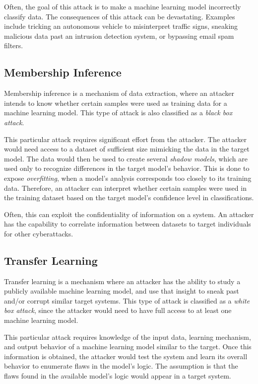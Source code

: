 \documentclass[11pt,conference]{IEEEtran}
\begin{document}
Often, the goal of this
attack is to make a machine learning model incorrectly classify data. The
consequences of this attack can be devastating. Examples include tricking an
autonomous vehicle to misinterpret traffic signs, sneaking malicious data past an
intrusion detection system, or bypassing email spam filters.

\subsection{Membership Inference}
Membership inference is a mechanism of data extraction, where an attacker 
intends to know whether certain samples were used as training data for a
machine learning model. This type of attack is also classified as a \emph{black box attack}.

This particular attack requires significant effort from the attacker.
The attacker would need access to a dataset of sufficient size mimicking the
data in the target model. The data would then be used to create several
\emph{shadow models}, which are used only to recognize differences
in the target model's behavior. This is done to expose \emph{overfitting}, when a model's analysis corresponds too
closely to its training data. Therefore, an attacker can interpret whether
certain samples were used in the training dataset based on the target model's
confidence level in classifications.

Often, this can exploit the confidentiality of information on a system. An
attacker has the capability to correlate information between datasets to target
individuals for other cyberattacks.

\subsection{Transfer Learning}
Transfer learning is a mechanism where an attacker has the ability to study a
publicly available machine learning model, and use that insight to sneak past
and/or corrupt similar target systems. This type of attack is classified as a
\emph{white box attack}, since the attacker would need to have full access to
at least one machine learning model.

This particular attack requires knowledge of the
input data, learning mechanism, and output behavior of a machine learning model
similar to the target. Once this information is obtained, the attacker would
test the system and learn its overall behavior to enumerate flaws in the
model's logic. The assumption is that the flaws found in the available model's
logic would appear in a target system.
\end{document}
